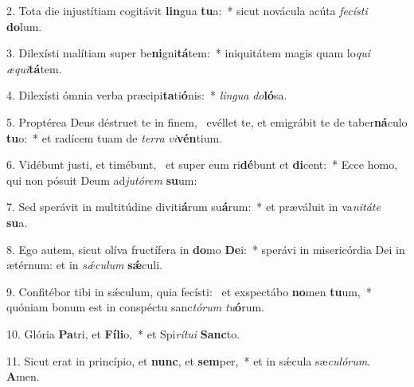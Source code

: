 2. Tota die injustítiam cogitávit \textbf{lin}gua \textbf{tu}a:~*  sicut novácula acúta \textit{fe}\textit{cís}\textit{ti} \textbf{do}lum.\

3. Dilexísti malítiam super be\textbf{ni}gni\textbf{tá}tem:~*  iniquitátem magis quam lo\textit{qui} \textit{æ}\textit{qui}\textbf{tá}tem.\

4. Dilexísti ómnia verba præcipi\textbf{ta}ti\textbf{ó}nis:~*  \textit{lin}\textit{gua} \textit{do}\textbf{ló}sa.\

5. Proptérea Deus déstruet te in finem, \dag\  evéllet te, et emigrábit te de taber\textbf{ná}culo \textbf{tu}o:~*  et radícem tuam de \textit{ter}\textit{ra} \textit{vi}\textbf{vén}tium.\

6. Vidébunt justi, et timébunt, \dag\  et super eum ri\textbf{dé}bunt et \textbf{di}cent:~*  Ecce homo, qui non pósuit Deum ad\textit{ju}\textit{tó}\textit{rem} \textbf{su}um:\

7. Sed sperávit in multitúdine diviti\textbf{á}rum su\textbf{á}rum:~*  et præváluit in va\textit{ni}\textit{tá}\textit{te} \textbf{su}a.\

8. Ego autem, sicut olíva fructífera in \textbf{do}mo \textbf{De}i:~*  sperávi in misericórdia Dei in ætérnum: et in \textit{sǽ}\textit{cu}\textit{lum} \textbf{sǽ}culi.\

9. Confitébor tibi in sǽculum, quia fecísti: \dag\  et exspectábo \textbf{no}men \textbf{tu}um,~*  quóniam bonum est in conspéctu sanc\textit{tó}\textit{rum} \textit{tu}\textbf{ó}rum.\

10. Glória \textbf{Pa}tri, et \textbf{Fí}\textbf{li}o,~*  et Spi\textit{rí}\textit{tu}\textit{i} \textbf{Sanc}to.\

11. Sicut erat in princípio, et \textbf{nunc}, et \textbf{sem}per,~*  et in sǽcula sæ\textit{cu}\textit{ló}\textit{rum}. \textbf{A}men.\


